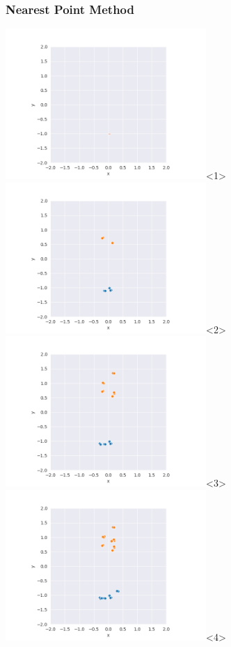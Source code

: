 \begin{frame}
  \frametitle{Nearest Point Method}
  \includegraphics[width=3in]{../png/single/single_1.png}<1>
  \includegraphics[width=3in]{../png/single/single_6.png}<2>
  \includegraphics[width=3in]{../png/single/single_11.png}<3>
  \includegraphics[width=3in]{../png/single/single_16.png}<4>

\end{frame}
